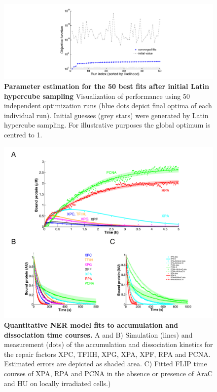 \begin{figure}[htbp]
\begin{center}
\includegraphics[width=1\textwidth]{Abbildungen/figure2_6_4.pdf}
\caption{\textbf{Parameter estimation for the 50 best fits after initial Latin hypercube sampling} Visualization of performance using 50 independent optimization runs (blue dots depict final optima of each individual run). Initial guesses (grey stars) were generated by Latin hypercube sampling. For illustrative purposes the global optimum is centred to 1.}
\label{fig:LHS}
\end{center}
\end{figure} 

\begin{figure}[htbp]
\begin{center}
\includegraphics[width=1\textwidth]{Abbildungen/figure2_6.pdf}
\caption{\textbf{Quantitative NER model fits to accumulation and dissociation time courses.} A and B) Simulation (lines) and measurement (dots) of the accumulation and dissociation kinetics for the repair factors XPC, TFIIH, XPG, XPA, XPF, RPA and PCNA. Estimated errors are depicted as shaded area. C) Fitted FLIP time courses of XPA, RPA and PCNA in the absence or presence of AraC and HU on locally irradiated cells.)}
\label{fig:ModelFit_accu_flip}
\end{center}
\end{figure}

